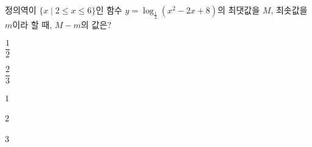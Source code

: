 정의역이 $\{x \mid 2\le x\le 6\}$인 함수 $y=\log_{\frac{1}{2}} (x^2-2x+8)$의 최댓값을 $M$, 최솟값을 $m$이라 할 때, $M-m$의 값은?
\begin{choices32}{\rule[-3ex]{0pt}{8ex}$\dfrac{1}{2}$}{\rule[-3ex]{0pt}{8ex}$\dfrac{2}{3}$}{\rule[-3ex]{0pt}{8ex}$1$}{\rule[-3ex]{0pt}{8ex}$2$}{\rule[-3ex]{0pt}{8ex}$3$}\end{choices32}
